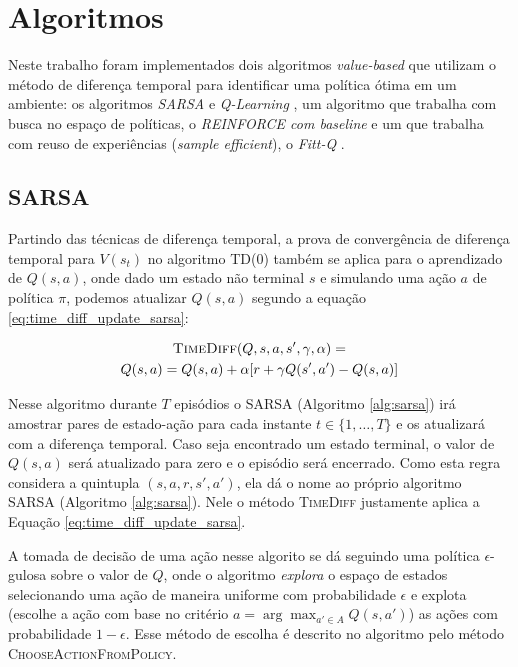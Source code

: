 \documentclass[letterpaper]{article}
\begin{document}
\section{Algoritmos}

Neste trabalho foram implementados dois algoritmos \textit{value-based} que utilizam o método de diferença temporal para identificar uma política ótima em um ambiente: os algoritmos \textit{SARSA} e \textit{Q-Learning} \cite{Watkins-Dayan-1992}, um algoritmo que trabalha com busca no espaço de políticas, o \textit{REINFORCE com baseline} e um que trabalha com reuso de experiências (\textit{sample efficient}), o \textit{Fitt-Q} \cite{Riedmiller-2005}.

\subsection{SARSA}

Partindo das técnicas de diferença temporal, a prova de convergência de diferença temporal para $V(s_t)$ no algoritmo \textsc{TD(0)} também se aplica para o aprendizado de $Q(s, a)$, onde dado um estado não terminal $s$ e simulando uma ação $a$ de política $\pi$, podemos atualizar $Q(s,a)$ segundo a equação \ref{eq:time_diff_update_sarsa}:

\begin{multline} \label{eq:time_diff_update_sarsa}
  \textsc{TimeDiff}(Q, s, a, s', \gamma, \alpha) = \\ 
  Q(s,a) = Q(s,a) + \alpha [r + \gamma Q(s', a') - Q(s,a)]
\end{multline}

Nesse algoritmo durante $T$ episódios o \textsc{SARSA} (Algoritmo \ref{alg:sarsa}) irá amostrar pares de estado-ação para cada instante $t \in \{ 1, \dots, T \}$ e os atualizará com a diferença temporal. Caso seja encontrado um estado terminal, o valor de $Q(s,a)$ será atualizado para zero e o episódio será encerrado. Como esta regra considera a quintupla $ (s, a, r, s', a') $, ela dá o nome ao próprio algoritmo \textsc{SARSA} (Algoritmo \ref{alg:sarsa}). Nele o método \textsc{TimeDiff} justamente aplica a Equação \ref{eq:time_diff_update_sarsa}. 

A tomada de decisão de uma ação nesse algorito se dá seguindo uma política $\epsilon$-gulosa sobre o valor de $Q$, onde o algoritmo \textit{explora} o espaço de estados selecionando uma ação de maneira uniforme com probabilidade $\epsilon$ e explota (escolhe a ação com base no critério $a = \arg \max_{a' \in A} Q(s, a') $) as ações com probabilidade $1 - \epsilon$. Esse método de escolha é descrito no algoritmo pelo método \textsc{ChooseActionFromPolicy}.
\end{document}

